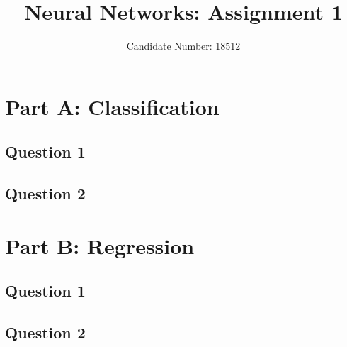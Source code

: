 \documentclass{article}
\title{Neural Networks: Assignment 1}
\author{Candidate Number: 18512}
\begin{document}
\maketitle

\section*{Part A: Classification}
\subsection*{Question 1}
\subsection*{Question 2}
\section*{Part B: Regression}
\subsection*{Question 1}
\subsection*{Question 2}
\end{document}
